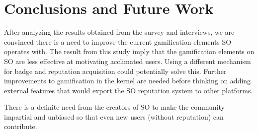 \documentclass{sigchi}
\begin{document}
\section{Conclusions and Future Work}

After analyzing the results obtained from the survey and interviews, we are convinced there is a need to improve the current gamification elements SO operates with. The result from this study imply that the gamification elements on SO are less effective at motivating acclimated users. Using a different mechanism for badge and reputation acquisition could potentially solve this. Further improvements to gamification in the kernel are needed before thinking on adding external features that would export the SO reputation system to other platforms. 

There is a definite need from the creators of SO to make the community impartial and unbiased so that even new users (without reputation) can contribute.  


% 
% 
\end{document}
